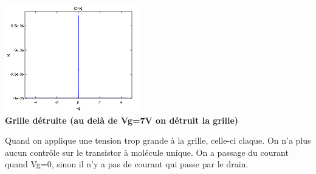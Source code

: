 \begin{center}
    \includegraphics[width=220px]{Images/Grille_Detruite.png}\\
    \textbf{Grille détruite (au delà de Vg=7V on détruit la grille)}
\end{center}
Quand on applique une tension trop grande à la grille, celle-ci claque. On n'a plus aucun contrôle sur le transistor à molécule unique. On a passage du courant quand Vg=0, sinon il n'y a pas de courant qui passe par le drain.\\
